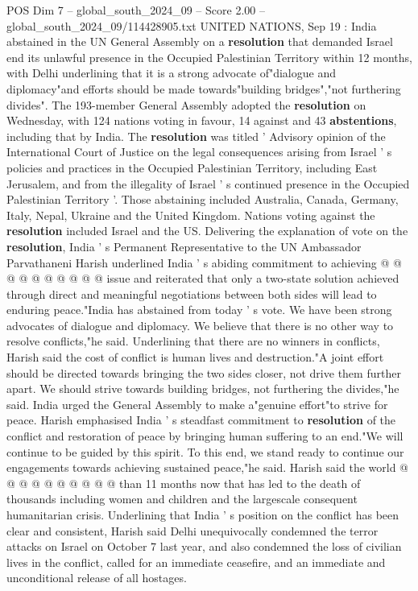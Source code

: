 \begin{textsample}{POS Dim 7 – global\_south\_2024\_09 – Score 2.00 – global\_south\_2024\_09/114428905.txt}  \label{ex:f7_pos_270}
UNITED NATIONS, Sep 19 : India abstained in the UN General Assembly on a \textbf{resolution} that demanded Israel end its unlawful presence in the Occupied Palestinian Territory within 12 months, with Delhi underlining that it is a strong advocate of"dialogue and diplomacy"and efforts should be made towards"building bridges","not furthering divides".
The 193-member General Assembly adopted the \textbf{resolution} on Wednesday, with 124 nations voting in favour, 14 against and 43 \textbf{abstentions}, including that by India.
The \textbf{resolution} was titled ' Advisory opinion of the International Court of Justice on the legal consequences arising from Israel ' s policies and practices in the Occupied Palestinian Territory, including East Jerusalem, and from the illegality of Israel ' s continued presence in the Occupied Palestinian Territory '.
Those abstaining included Australia, Canada, Germany, Italy, Nepal, Ukraine and the United Kingdom.
Nations voting against the \textbf{resolution} included Israel and the US.
Delivering the explanation of vote on the \textbf{resolution}, India ' s Permanent Representative to the UN Ambassador Parvathaneni Harish underlined India ' s abiding commitment to achieving @ @ @ @ @ @ @ @ @ @ issue and reiterated that only a two-state solution achieved through direct and meaningful negotiations between both sides will lead to enduring peace."India has abstained from today ' s vote.
We have been strong advocates of dialogue and diplomacy.
We believe that there is no other way to resolve conflicts,"he said.
Underlining that there are no winners in conflicts, Harish said the cost of conflict is human lives and destruction."A joint effort should be directed towards bringing the two sides closer, not drive them further apart.
We should strive towards building bridges, not furthering the divides,"he said.
India urged the General Assembly to make a"genuine effort"to strive for peace.
Harish emphasised India ' s steadfast commitment to \textbf{resolution} of the conflict and restoration of peace by bringing human suffering to an end."We will continue to be guided by this spirit.
To this end, we stand ready to continue our engagements towards achieving sustained peace,"he said.
Harish said the world @ @ @ @ @ @ @ @ @ @ than 11 months now that has led to the death of thousands including women and children and the largescale consequent humanitarian crisis.
Underlining that India ' s position on the conflict has been clear and consistent, Harish said Delhi unequivocally condemned the terror attacks on Israel on October 7 last year, and also condemned the loss of civilian lives in the conflict, called for an immediate ceasefire, and an immediate and unconditional release of all hostages.

\end{textsample}
